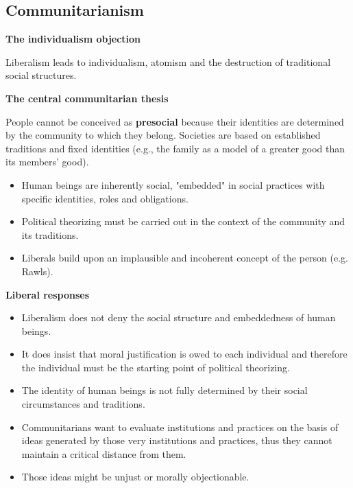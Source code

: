 \subsection{Communitarianism}

\textbf{The individualism objection}

Liberalism leads to individualism, atomism and the destruction of traditional
social structures.

\textbf{The central communitarian thesis}

People cannot be conceived as \textbf{presocial} because their identities are
determined by the community to which they belong. Societies are based on
established traditions and fixed identities (e.g., the family as a model of a
greater good than its members' good).
\begin{itemize}
	\item Human beings are inherently social, "embedded" in social
	 practices with specific identities, roles and obligations.
	\item Political theorizing must be carried out in the context of the
	 community and its traditions.
	\item Liberals build upon an implausible and incoherent concept of the
	 person (e.g. Rawls).
\end{itemize}

\textbf{Liberal responses}
\begin{itemize}
	\item Liberalism does not deny the social structure and embeddedness of
	 human beings.
	\item It does insist that moral justification is owed to each
	 individual and therefore the individual must be the starting point of
	 political theorizing.
	\item The identity of human beings is not fully determined by their
	 social circumstances and traditions.
	\item Communitarians want to evaluate institutions and practices on the
	 basis of ideas generated by those very institutions and practices,
	 thus they cannot maintain a critical distance from them.
	\item Those ideas might be unjust or morally objectionable.
\end{itemize}

